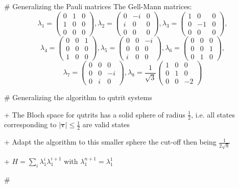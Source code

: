 # Generalizing the Pauli matrices
The Gell-Mann matrices:
$$\lambda_1=\begin{pmatrix} 0 & 1 & 0 \\ 1 & 0 & 0 \\ 0 & 0 & 0 \end{pmatrix},
\lambda_2=\begin{pmatrix} 0 & -i & 0 \\ i & 0 & 0 \\ 0 & 0 & 0 \end{pmatrix},
\lambda_3=\begin{pmatrix} 1 & 0 & 0 \\ 0 & -1 & 0 \\ 0 & 0 & 0 \end{pmatrix},$$
$$\lambda_4=\begin{pmatrix} 0 & 0 & 1 \\ 0 & 0 & 0 \\ 1 & 0 & 0 \end{pmatrix},
\lambda_5=\begin{pmatrix} 0 & 0 & -i \\ 0 & 0 & 0 \\ i & 0 & 0 \end{pmatrix},
\lambda_6=\begin{pmatrix} 0 & 0 & 0 \\ 0 & 0 & 1 \\ 0 & 1 & 0 \end{pmatrix},$$
$$\lambda_7=\begin{pmatrix} 0 & 0 & 0 \\ 0 & 0 & -i \\ 0 & i & 0 \end{pmatrix},
\lambda_8=\frac{1}{\sqrt{3}} \begin{pmatrix} 1 & 0 & 0 \\ 0 & 1 & 0 \\ 0 & 0 & -2 \end{pmatrix}$$


# Generalizing the algorithm to qutrit systems

+ The Bloch space for qutrits has a solid sphere of radius $\frac{1}{2}$, i.e. all states corresponding to $\left| \bm{\tau} \right| \le \frac{1}{2}$ are valid states

+ Adapt the algorithm to this smaller sphere the cut-off then being $\frac{1}{2\sqrt{8}}$

+ $H=\sum_{i}\lambda_1^{i}\lambda_1^{i+1}$ with $\lambda^{n+1}_1=\lambda^{1}_1$

#

